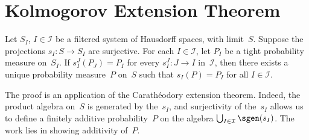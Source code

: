 \chapter	{Kolmogorov Extension Theorem}

\begin	{theorem}	
Let $S_I$, \( I \in \mathcal I \) be a filtered system of Hausdorff spaces,
with limit~$S$.
Suppose the projections \( s_I \colon S \to S_I \) are surjective.
For each \( I \in \mathcal I \), let $P_I$ be a tight probability measure
on~$S_I$.
If \( s_I^J(P_J) = P_I \) for every \( s_I^J \colon J \to I \) in~$\mathcal I$,
then there exists a unique probability measure~$P$ on~$S$ such that
\( s_I(P) = P_I \) for all \( I \in \mathcal I \).
\end	{theorem}
The proof is an application of the Carathéodory extension theorem.
Indeed, the product \sig algebra on~$S$ is generated by the~$s_I$,
and surjectivity of the~$s_I$ allows us to define a finitely additive
probability~$P$ on the algebra
\( \bigcup_{I \in \mathcal I} \sgen(s_I) \).
The work lies in showing \sig additivity of~$P$.
